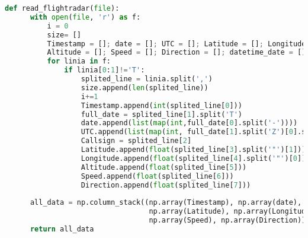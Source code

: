 \documentclass[fleqn,10pt,a4paper]{article}
\begin{document}
\begin{lstlisting}[language=Python, caption=Funkcja wczytywania danych udostępniona przez prowadzącego, label = read]
  def read_flightradar(file):
      with open(file, 'r') as f:
          i = 0
          size= []
          Timestamp = []; date = []; UTC = []; Latitude = []; Longitude = []; 
          Altitude = []; Speed = []; Direction = []; datetime_date = []
          for linia in f:
              if linia[0:1]!='T':
                  splited_line = linia.split(',')
                  size.append(len(splited_line))
                  i+=1
                  Timestamp.append(int(splited_line[0]))
                  full_date = splited_line[1].split('T')
                  date.append(list(map(int,full_date[0].split('-'))))
                  UTC.append(list(map(int, full_date[1].split('Z')[0].split(':'))))
                  Callsign = splited_line[2]
                  Latitude.append(float(splited_line[3].split('"')[1]))
                  Longitude.append(float(splited_line[4].split('"')[0]))
                  Altitude.append(float(splited_line[5]))
                  Speed.append(float(splited_line[6]))
                  Direction.append(float(splited_line[7]))
                  
      all_data = np.column_stack((np.array(Timestamp), np.array(date), np.array(UTC),
                                  np.array(Latitude), np.array(Longitude), np.array(Altitude),
                                  np.array(Speed), np.array(Direction)))
      return all_data
\end{lstlisting}
\end{document}
